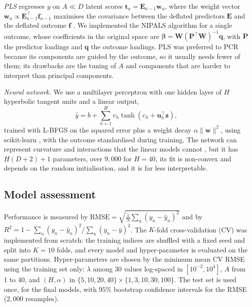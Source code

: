 \documentclass[conference]{IEEEtran}
\begin{document}
\emph{PLS} regresses $y$ on $A \ll D$ latent scores
$\mathbf{t}_a = \mathbf{E}_{a-1}\mathbf{w}_a$, where the weight vector
$\mathbf{w}_a \propto \mathbf{E}_{a-1}^\top\mathbf{f}_{a-1}$ maximises
the covariance between the deflated predictors $\mathbf{E}$ and the
deflated outcome $\mathbf{f}$ \cite{wold2001}. We implemented the
NIPALS algorithm for a single outcome, whose coefficients in the
original space are
$\boldsymbol\beta = \mathbf{W}(\mathbf{P}^\top\mathbf{W})^{-1}\mathbf{q}$,
with $\mathbf{P}$ the predictor loadings and $\mathbf{q}$ the outcome
loadings. PLS was preferred to PCR because its components are guided
by the outcome, so it usually needs fewer of them; its drawbacks are
the tuning of $A$ and components that are harder to interpret than
principal components.

\emph{Neural network.} We use a multilayer perceptron with one hidden
layer of $H$ hyperbolic tangent units and a linear output,
\begin{equation}
\hat y = b + \sum_{h=1}^{H} v_h \tanh\!\left(c_h + \mathbf{u}_h^\top\mathbf{z}\right),
\label{eq:mlp}
\end{equation}
trained with L-BFGS on the squared error plus a weight decay
$\alpha\lVert\mathbf{w}\rVert^2$, using scikit-learn
\cite{pedregosa2011}, with the outcome standardised during training.
The network can represent curvature and interactions that the linear
models cannot \cite{hornik1989}, but it has $H(D+2)+1$ parameters, over
$9{,}000$ for $H = 40$, its fit is non-convex and depends on the random
initialisation, and it is far less interpretable.

\subsection{Model assessment}
\label{subsec:assess}

Performance is measured by
$\mathrm{RMSE} = \sqrt{\frac{1}{N}\sum_n (y_n-\hat y_n)^2}$ and by
$R^2 = 1 - \sum_n (y_n-\hat y_n)^2 / \sum_n (y_n-\bar y)^2$. The
$K$-fold cross-validation (CV) was implemented from scratch: the
training indices are shuffled with a fixed seed and split into $K=10$
folds, and every model and hyper-parameter is evaluated on the same
partitions. Hyper-parameters are chosen by the minimum mean CV RMSE
using the training set only: $\lambda$ among 30 values log-spaced in
$[10^{-2},10^{4}]$, $A$ from 1 to 40, and $(H,\alpha)$ in
$\{5,10,20,40\}\times\{1,3,10,30,100\}$. The test set is used once, for
the final models, with $95\%$ bootstrap confidence intervals for the
RMSE ($2{,}000$ resamples).
\end{document}
